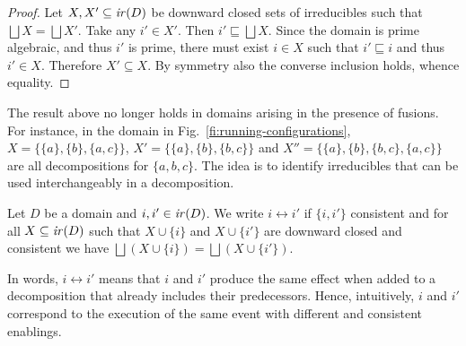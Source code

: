 \begin{proof}
  Let $X, X' \subseteq \mathop{\mathit{ir}({D})}$ be downward closed sets of irreducibles
  such that $\bigsqcup X = \bigsqcup X'$.  Take any $i' \in X'$. Then
  $i' \sqsubseteq \bigsqcup X$. Since the domain is prime
  algebraic, and thus $i'$ is prime, there must exist $i \in X$ such
  that $i' \sqsubseteq i$ and thus $i' \in X$.  Therefore
  $X' \subseteq X$. By symmetry also the converse inclusion holds,
  whence equality.
\end{proof}



The result above no longer holds in domains arising in the presence
of fusions.  For instance, in the domain in
Fig.~\ref{fi:running-configurations},
$X = \{ \{a\}, \{b\}, \{a,c\} \}$, $X'= \{ \{a\}, \{b\}, \{b,c\} \}$
and $X''= \{ \{a\}, \{b\}, \{b,c\}, \{a,c\} \}$ are all decompositions
for $\{a,b,c\}$.
%
The idea is to identify irreducibles
that can be used interchangeably in a decomposition.


\begin{definition}[interchangeability]
  \label{de:interchangeable}
  Let $D$ be a domain and $i, i' \in \mathop{\mathit{ir}({D})}$. We write
  $i \leftrightarrow i'$ if $\{i, i'\}$ consistent and for all
  $X \subseteq \mathop{\mathit{ir}({D})}$ such that $X \cup \{ i \}$ and
  $ X \cup \{ i' \}$ are downward closed and consistent we have
  $\bigsqcup (X \cup \{ i \}) = \bigsqcup (X \cup \{ i' \})$.
\end{definition}

In words, $i \leftrightarrow i'$ means that $i$ and $i'$ produce the
same effect when added to a decomposition that already includes their
predecessors.
%
Hence, intuitively, $i$ and $i'$ correspond to the execution of the
same event with different and consistent enablings.


